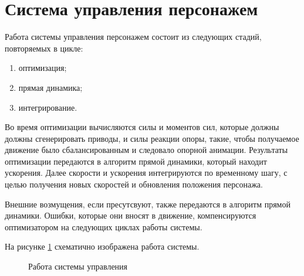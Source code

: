\section{Система управления персонажем}

Работа системы управления персонажем состоит из следующих стадий, повторяемых в цикле:
\begin{enumerate}
  \item оптимизация;
  \item прямая динамика;
  \item интегрирование.
\end{enumerate}

Во время оптимизации вычисляются силы и моментов сил, которые должны должны сгенерировать приводы, и силы реакции опоры, такие, чтобы получаемое движение было сбалансированным и следовало опорной анимации. Результаты оптимизации передаются в алгоритм прямой динамики, который находит ускорения. Далее скорости и ускорения интегрируются по временному шагу, с целью получения новых скоростей и обновления положения персонажа.

Внешние возмущения, если пресутсвуют, также передаются в алгоритм прямой динамики. Ошибки, которые они вносят в движение, компенсируются оптимизатором на следующих циклах работы системы.

На рисунке \ref{fig:architecture} схематично изображена работа системы.

\begin{figure}[ht]
  \begin{minipage}{\textwidth}
    \centering
    \caption{Работа системы управления}
    \label{fig:architecture}
  \end{minipage}
\end{figure}

